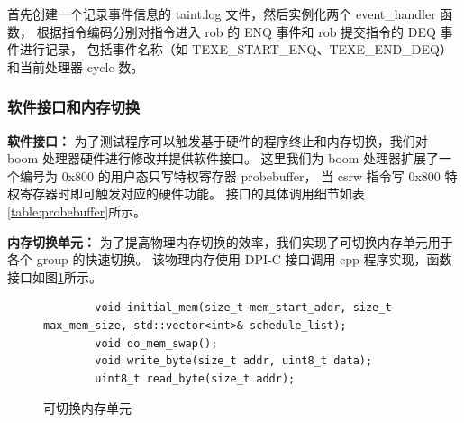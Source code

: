 首先创建一个记录事件信息的 taint.log 文件，然后实例化两个 event\_handler 函数，
根据指令编码分别对指令进入 rob 的 ENQ 事件和 rob 提交指令的 DEQ 事件进行记录，
包括事件名称（如 TEXE\_START\_ENQ、TEXE\_END\_DEQ）和当前处理器 cycle 数。

\subsubsection{软件接口和内存切换}

\textbf{软件接口：}
为了测试程序可以触发基于硬件的程序终止和内存切换，我们对 boom 处理器硬件进行修改并提供软件接口。
这里我们为 boom 处理器扩展了一个编号为 0x800 的用户态只写特权寄存器 probebuffer，
当 csrw 指令写 0x800 特权寄存器时即可触发对应的硬件功能。
接口的具体调用细节如表\ref{table:probebuffer}所示。\par

\begin{table}[h!]
    \begin{center} 
    \caption{probebuffer 软件接口} 
    \label{table:probebuffer}  
    \end{center}
\end{table}

\textbf{内存切换单元：}
为了提高物理内存切换的效率，我们实现了可切换内存单元用于各个 group 的快速切换。
该物理内存使用 DPI-C 接口调用 cpp 程序实现，函数接口如图\ref{code:swappable-memory}所示。

\begin{figure}[htbp]
    \centering
    \begin{verbatim}
        void initial_mem(size_t mem_start_addr, size_t max_mem_size, std::vector<int>& schedule_list);
        void do_mem_swap();
        void write_byte(size_t addr, uint8_t data);
        uint8_t read_byte(size_t addr);
    \end{verbatim}
    \caption{可切换内存单元}
    \label{code:swappable-memory}
\end{figure}

